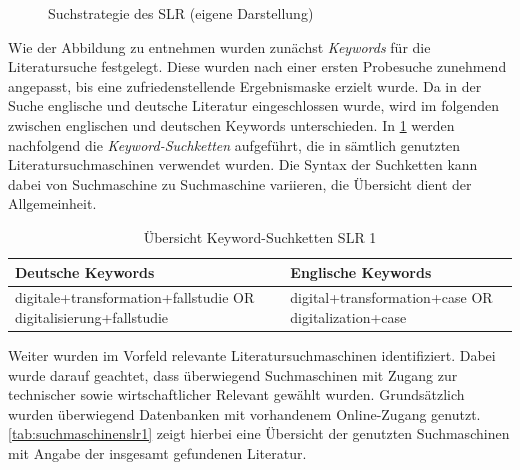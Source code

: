 
\begin{figure}[H]
	\centering
	\caption[Suchstrategie des SLR]{Suchstrategie des SLR (eigene Darstellung)}
	\label{fig:suchstrategie}
\end{figure}

Wie der Abbildung zu entnehmen wurden zunächst \textit{Keywords} für die  Literatursuche festgelegt. Diese wurden nach einer ersten Probesuche zunehmend angepasst, bis eine zufriedenstellende Ergebnismaske erzielt wurde. Da in der Suche englische  und deutsche Literatur eingeschlossen wurde, wird im folgenden zwischen englischen und deutschen Keywords unterschieden. In \ref{tab:keywordsslr1} werden nachfolgend die \textit{Keyword-Suchketten} aufgeführt, die in sämtlich genutzten Literatursuchmaschinen verwendet wurden. Die Syntax der Suchketten kann dabei  von Suchmaschine zu  Suchmaschine variieren, die Übersicht dient der Allgemeinheit.

\begin{table}[ht]
	\centering
	\caption{Übersicht Keyword-Suchketten SLR 1}
	\begin{tabular}{|p{7cm}|p{7cm}|}
		\hline
		\textbf{Deutsche Keywords}& \textbf{Englische Keywords} \\
		\hline
		digitale+transformation+fallstudie OR digitalisierung+fallstudie   & digital+transformation+case OR digitalization+case \\
		\hline
	\end{tabular}
	\label{tab:keywordsslr1}
\end{table}

Weiter wurden im Vorfeld relevante Literatursuchmaschinen identifiziert. Dabei wurde darauf geachtet, dass überwiegend Suchmaschinen mit Zugang zur technischer sowie wirtschaftlicher Relevant gewählt wurden. Grundsätzlich wurden überwiegend Datenbanken mit vorhandenem Online-Zugang genutzt.  \ref{tab:suchmaschinenslr1} zeigt hierbei  eine Übersicht der genutzten Suchmaschinen mit Angabe der insgesamt gefundenen Literatur.


